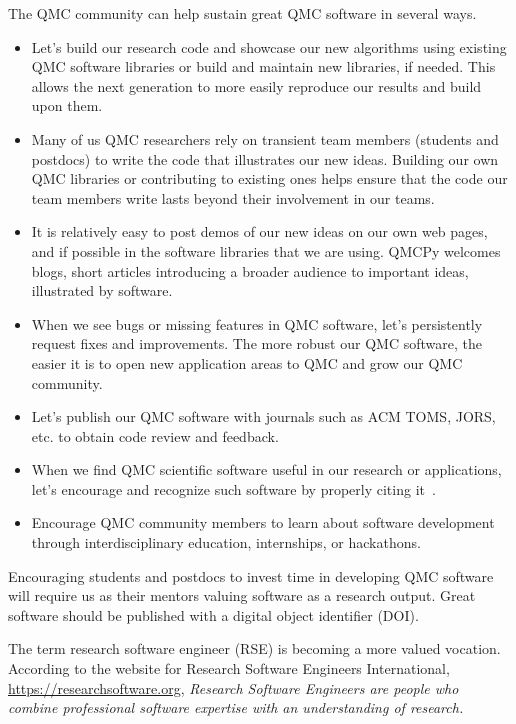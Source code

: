 \documentclass[graybox]{svmult}
\begin{document}
The QMC community can help sustain great QMC software in several ways.  \begin{itemize}
	\item Let's build our research code and showcase our new algorithms using existing QMC software libraries or build and maintain new libraries, if needed.  This allows the next generation to more easily reproduce our results and build upon them.

	\item Many of us QMC researchers rely on transient team members (students and postdocs) to write the code that illustrates our new ideas.  Building our own QMC libraries or contributing to existing ones helps ensure that the code our team members write lasts beyond their involvement in our teams.

	\item It is relatively easy to post demos of our new ideas on our own web pages, and if possible in the software libraries that we are using.  QMCPy welcomes blogs, short articles introducing a broader audience to important ideas, illustrated by software.

	\item When we see bugs or missing features in QMC software, let's persistently request fixes and improvements.  The more robust our QMC software, the easier it is to open new application areas to QMC and grow our QMC community.

    \item Let's publish our QMC  software with journals such as ACM TOMS, JORS, etc. to obtain code review and
    feedback.

    \item When we find QMC scientific software useful in our research or applications, let's encourage and recognize such software by properly citing it~\cite{smith2016software}.

    \item Encourage QMC community members to learn about software development through interdisciplinary education, internships, or hackathons.

\end{itemize}


Encouraging students and postdocs to invest time in developing QMC software will require us as their mentors valuing software as a research output.  Great software should be published with a digital object identifier (DOI).

The term research software engineer (RSE) is becoming a more valued vocation.  According to the website for  Research Software Engineers International, 
\href{https://researchsoftware.org}{\url{https://researchsoftware.org}}, \emph{Research Software Engineers are people who combine professional software expertise with an understanding of research.}
\end{document}

